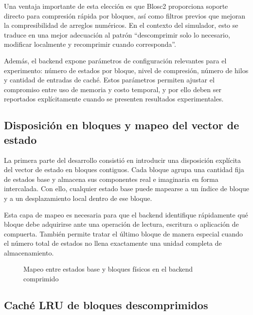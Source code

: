 Una ventaja importante de esta elección es que Blosc2 proporciona soporte directo para compresión rápida por bloques, así como filtros previos que
mejoran la compresibilidad de arreglos numéricos. En el contexto del simulador, esto se traduce en una mejor adecuación al patrón ``descomprimir
solo lo necesario, modificar localmente y recomprimir cuando corresponda''.

Además, el backend expone parámetros de configuración relevantes para el experimento: número de estados por bloque, nivel de compresión, número de
hilos y cantidad de entradas de caché. Estos parámetros permiten ajustar el compromiso entre uso de memoria y costo temporal, y por ello deben ser
reportados explícitamente cuando se presenten resultados experimentales.

\subsection{Disposición en bloques y mapeo del vector de estado}

La primera parte del desarrollo consistió en introducir una disposición explícita del vector de estado en bloques contiguos. Cada bloque agrupa una
cantidad fija de estados base y almacena sus componentes real e imaginaria en forma intercalada. Con ello, cualquier estado base puede mapearse a un
índice de bloque y a un desplazamiento local dentro de ese bloque.

Esta capa de mapeo es necesaria para que el backend identifique rápidamente qué bloque debe adquirirse ante una operación de lectura, escritura o
aplicación de compuerta. También permite tratar el último bloque de manera especial cuando el número total de estados no llena exactamente una unidad
completa de almacenamiento.

\begin{figure}[H]
    \centering
    \caption{Mapeo entre estados base y bloques físicos en el backend comprimido}
    \label{fig:development-layout}
\end{figure}

\subsection{Caché LRU de bloques descomprimidos}

